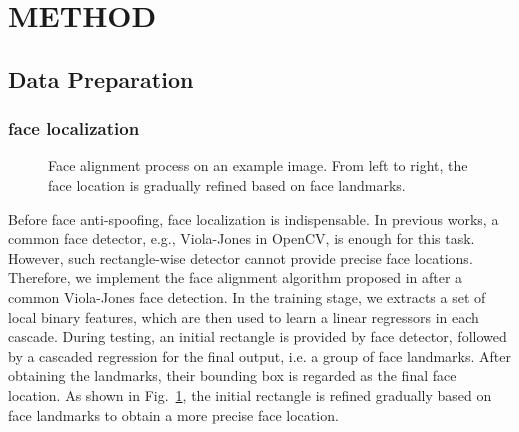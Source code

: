 \documentclass[letterpaper, 10 pt, conference]{ieeeconf}
\begin{document}
\section{METHOD}

\subsection{Data Preparation}

\subsubsection{face localization}
\label{face_localization}

\begin{figure}[!hb]
\begin{minipage}[b]{0.18\linewidth}
\centering
\centerline{}
\end{minipage}
\hfill
\begin{minipage}[b]{0.18\linewidth}
\centering
\centerline{}
\end{minipage}
\hfill
\begin{minipage}[b]{0.18\linewidth}
\centering
\centerline{}
\end{minipage}
\hfill
\begin{minipage}[b]{0.18\linewidth}
\centering
\centerline{}
\end{minipage}
\hfill
\begin{minipage}[b]{0.18\linewidth}
\centering
\centerline{}
\end{minipage}
\caption{Face alignment process on an example image. From left to right, the face location is gradually refined based on face landmarks.}
\label{Fig_3}
\end{figure}

Before face anti-spoofing, face localization is indispensable. In previous works, a common face detector, e.g., Viola-Jones in OpenCV, is enough for this task. However, such rectangle-wise detector cannot provide precise face locations. Therefore, we implement the face alignment algorithm proposed in \cite{renface} after a common Viola-Jones face detection. In the training stage, we extracts a set of local binary features, which are then used to learn a linear regressors in each cascade. During testing, an initial rectangle is provided by face detector, followed by a cascaded regression for the final output, i.e. a group of face landmarks. After obtaining the landmarks, their bounding box is regarded as the final face location. As shown in Fig.~\ref{Fig_3}, the initial rectangle is refined gradually based on face landmarks to obtain a more precise face location.
\end{document}
